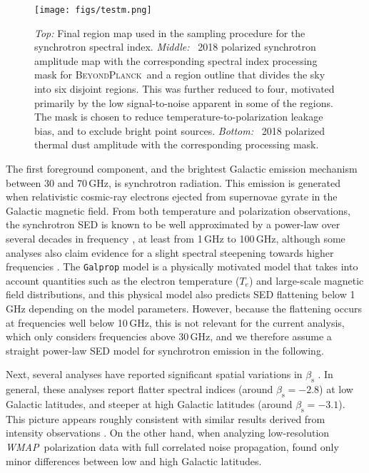 \documentclass[twocolumn]{aa}
\def\WMAP{\textit{WMAP}}
\newcommand{\BP}{\textsc{BeyondPlanck}}
\newcommand{\?}[1]{\textcolor{red}{{\bf [#1]}}}
\begin{document}
\begin{figure}[t]
\texttt{[image: figs/testm.png]}\\ 
\caption{\emph{Top:} Final region map used in the sampling procedure
  for the synchrotron spectral index. \emph{Middle:} \Planck\ 2018
  polarized synchrotron amplitude map with the corresponding spectral
  index processing mask for \BP\ and a region outline that divides the sky into
  six disjoint regions. This was further reduced to four, motivated
  primarily by the low signal-to-noise apparent in some of the
  regions. The mask is chosen to reduce temperature-to-polarization
  leakage bias, and to exclude bright point sources. \emph{Bottom:}
  \Planck\ 2018 polarized thermal dust amplitude with the
  corresponding processing mask.}\label{fig:regions}
\end{figure}

The first foreground component, and the brightest Galactic emission mechanism
between 30 and 70\,GHz, is synchrotron radiation. This emission is generated
when relativistic cosmic-ray electrons ejected from supernovae gyrate in the
Galactic magnetic field. From both temperature and polarization observations,
the synchrotron SED is known to be well approximated by a power-law over several
decades in frequency \citep[e.g.,][]{lawson1987, reich1988, Platania2003,
Davies2006, gold2009}, at least from 1\,GHz to 100\,GHz, although some analyses
also claim evidence for a slight spectral steepening towards higher frequencies
\citep{kogut:2012,jew2019}. The \texttt{Galprop} model \citep{orlando:2018} is a
physically motivated model that takes into account quantities such as the
electron temperature ($T_e$) and large-scale magnetic field distributions, and
this physical model also predicts SED flattening below 1\,GHz depending on the
model parameters. However, because the flattening occurs at frequencies well
below 10\,GHz, this is not relevant for the current analysis, which only
considers frequencies above 30\,GHz, and we therefore assume a straight
power-law SED model for synchrotron emission in the following.

Next, several analyses have reported significant spatial variations in
$\beta_\mathrm{s}$
\citep[e.g.,][]{fuskeland2014,krachmalnicoff2018,fuskeland:2019}. In
general, these analyses report flatter spectral indices (around
$\beta_{\mathrm{s}}=-2.8$) at low Galactic latitudes, and steeper at
high Galactic latitudes (around $\beta_{\mathrm{s}}=-3.1$). This
picture appears roughly consistent with similar results derived from
intensity observations \citep[e.g.,][]{vidal2014, platania1998,
lawson1987, reich1988}. On the other hand, when analyzing
low-resolution \WMAP\ polarization data with full correlated noise
propagation, \citet{dunkley2009} found only minor differences between
low and high Galactic latitudes.
\end{document}

